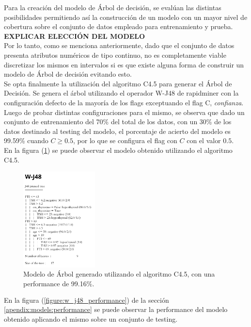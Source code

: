 \documentclass[osajnl,twocolumn,showpacs,superscriptaddress,10pt,floatfix]{revtex4-1} %
\begin{document}
Para la creación del modelo de Árbol de decisión, se evalúan las distintas posibilidades permitiendo así la construcción de un modelo con un mayor nivel de cobertura sobre el conjunto de datos empleado para entrenamiento y prueba. \\

\textbf{EXPLICAR ELECCIÓN DEL MODELO} \\

Por lo tanto, como se menciona anteriormente, dado que el conjunto de datos presenta atributos numéricos de tipo continuo, no es completamente viable discretizar los mismos en intervalos si es que existe alguna forma de construir un modelo de Árbol de decisión evitando esto. \\

Se opta finalmente la utilización del algoritmo C4.5 para generar el Árbol de Decisión. Se genera el árbol utilizando el operador W-J48 de rapidminer con la configuración defecto de la mayoría de los flags exceptuando el flag C, \textit{confianza}. Luego de probar distintas configuraciones para el mismo, se observa que dado un conjunto de entrenamiento del 70\% del total de los datos, con un 30\% de los datos destinado al testing del modelo, el porcentaje de acierto del modelo es 99.59\% cuando $C \geq 0.5$, por lo que se configura el flag con $C$ con el valor $0.5$. \\

En la figura (\ref{figure:w_j48}) se puede observar el modelo obtenido utilizando el algoritmo C4.5.

\begin{figure}[H]
    \centering
    \includegraphics[width=0.35\textwidth]{models/w_j48}
    \caption{Modelo de Árbol generado utilizando el algoritmo C4.5, con una performance de 99.16\%.}
    \label{figure:w_j48}
\end{figure}

En la figura (\ref{figure:w_j48_performance}) de la sección \ref{apendix:models:performance} se puede observar la performance del modelo obtenido aplicando el mismo sobre un conjunto de testing. \\
\end{document}
